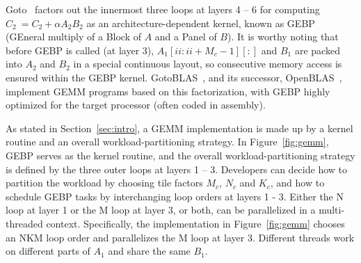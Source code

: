 Goto~\cite{gotogemm} factors out the innermost three loops at layers 4 -- 6 for
computing $C_2\ = C_2 + \alpha A_2 B_2$ as an architecture-dependent kernel,
known as  GEBP (GEneral multiply of a Block of $A$ and a Panel of $B$).
It is worthy noting that before GEBP is called (at layer 3),
$A_1[ii:ii+M_c-1][:]$ and $B_1$ are packed into $A_2$ and $B_2$
in a special continuous layout,
so consecutive memory access is ensured within the GEBP kernel.
GotoBLAS~\cite{gotoblas}, and its successor, OpenBLAS~\cite{openblas},
implement GEMM programs based on this factorization,
with GEBP highly optimized for the target processor (often coded in assembly).

As stated in Section~\ref{sec:intro}, a GEMM implementation
is made up by a kernel routine and an overall workload-partitioning strategy.
In Figure~\ref{fig:gemm}, GEBP serves as the kernel routine,
and the overall workload-partitioning strategy is defined by the three outer loops at layers 1 -- 3.
Developers can decide how to partition the workload by choosing
tile factors $M_c$, $N_c$ and $K_c$,
and how to schedule GEBP tasks by interchanging loop orders at layers 1 - 3.
Either the N loop at layer 1 or the M loop at layer 3, or 
both,
can be parallelized in a multi-threaded context.
Specifically, the implementation in Figure~\ref{fig:gemm}
chooses an NKM loop order and parallelizes the M loop at layer 3.
Different threads work on different parts of $A_1$
and share the same $B_1$.

